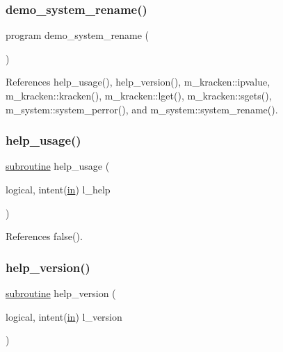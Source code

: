 \subsubsection{\texorpdfstring{demo\+\_\+system\+\_\+rename()}{demo\_system\_rename()}}
{\footnotesize\ttfamily program demo\+\_\+system\+\_\+rename (\begin{DoxyParamCaption}{ }\end{DoxyParamCaption})}



References help\+\_\+usage(), help\+\_\+version(), m\+\_\+kracken\+::ipvalue, m\+\_\+kracken\+::kracken(), m\+\_\+kracken\+::lget(), m\+\_\+kracken\+::sgets(), m\+\_\+system\+::system\+\_\+perror(), and m\+\_\+system\+::system\+\_\+rename().

\mbox{\label{__mv_8f90_a3e09a3b52ee8fb04eeb93fe5761626a8}} 
\subsubsection{\texorpdfstring{help\+\_\+usage()}{help\_usage()}}
{\footnotesize\ttfamily \hyperlink{M__stopwatch_83_8txt_acfbcff50169d691ff02d4a123ed70482}{subroutine} help\+\_\+usage (\begin{DoxyParamCaption}\item[{logical, intent(\hyperlink{M__journal_83_8txt_afce72651d1eed785a2132bee863b2f38}{in})}]{l\+\_\+help }\end{DoxyParamCaption})}



References false().

\mbox{\label{__mv_8f90_a39c21619b08a3c22f19e2306efd7f766}} 
\subsubsection{\texorpdfstring{help\+\_\+version()}{help\_version()}}
{\footnotesize\ttfamily \hyperlink{M__stopwatch_83_8txt_acfbcff50169d691ff02d4a123ed70482}{subroutine} help\+\_\+version (\begin{DoxyParamCaption}\item[{logical, intent(\hyperlink{M__journal_83_8txt_afce72651d1eed785a2132bee863b2f38}{in})}]{l\+\_\+version }\end{DoxyParamCaption})}



